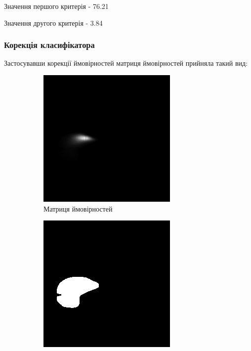 Значення першого критерія - 76.21%

Значення другого критерія - 3.84%

\subsubsection{Корекція класифікатора}

Застосувавши корекції ймовірностей матриця ймовірностей прийняла такий вид:
\begin{figure}[H]
	\centering
	\begin{subfigure}[b]{0.45\textwidth}
		\includegraphics[width=\textwidth]{practise/img/b_end}
		\caption{Матриця ймовірностей}
		\label{fig:b_start}
	\end{subfigure}
	\hfill
	\begin{subfigure}[b]{0.45\textwidth}
		\includegraphics[width=\textwidth]{practise/img/b_end_gen}

\end{subfigure}
\end{figure}
